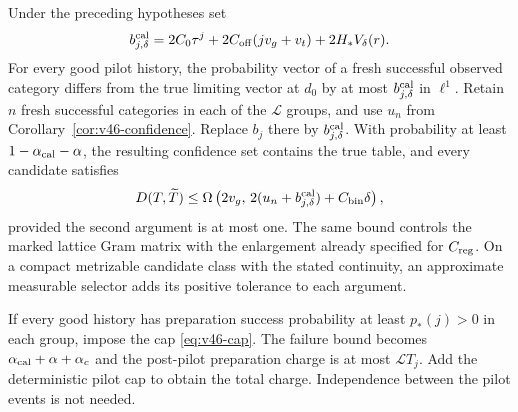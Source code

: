\begin{theorem}
\label{thm:v47-calibrated-confidence}
Under the preceding hypotheses set
\begin{equation}\label{eq:v47-calibration-bias}
 b^{\rm cal}_{j,\delta}
 =2C_0\tau^j+2C_{\rm off}(jv_g+v_t)+2H_*V_\delta(r).
\end{equation}
For every good pilot history, the probability vector of a fresh successful
observed category differs from the true limiting vector at $d_0$ by at most
$b^{\rm cal}_{j,\delta}$ in $\ell^1$.
Retain $n$ fresh successful categories in each of the $\mathcal L$ groups,
and use $u_n$ from Corollary~\ref{cor:v46-confidence}.  Replace $b_j$ there
by $b^{\rm cal}_{j,\delta}$.  With probability at least
$1-\alpha_{\rm cal}-\alpha$, the resulting confidence set contains the
true table, and every candidate satisfies
\begin{equation}\label{eq:v47-calibrated-radius}
 D(T,\widetilde T)\le
 \Omega\left(2v_g,\,
  2(u_n+b^{\rm cal}_{j,\delta})+C_{\rm bin}\delta\right),
\end{equation}
provided the second argument is at most one.  The same bound controls the
marked lattice Gram matrix with the enlargement already specified for
$C_{\rm reg}$.  On a compact metrizable candidate class with the stated
continuity, an approximate measurable selector adds its positive tolerance
to each argument.

If every good history has preparation success probability at least
$p_*(j)>0$ in each group, impose the cap
\eqref{eq:v46-cap}.  The failure bound becomes
$\alpha_{\rm cal}+\alpha+\alpha_c$ and the post-pilot preparation charge
is at most $\mathcal L T_j$.  Add the deterministic pilot cap to obtain
the total charge.  Independence between the pilot events is not needed.
\end{theorem}

